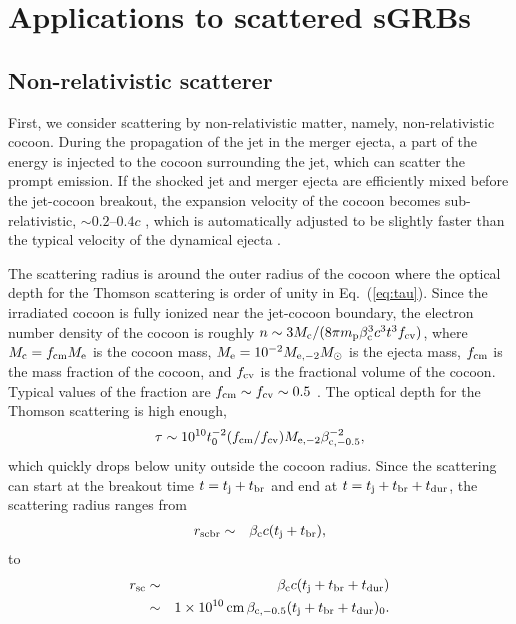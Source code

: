 \documentclass{emulateapj}
\begin{document}
\section{Applications to scattered sGRBs}
\label{sec:scatterer}

\subsection{Non-relativistic scatterer}\label{sec:nonrela}

First, we consider scattering by non-relativistic matter, namely, non-relativistic cocoon.
During the propagation of the jet in the merger ejecta, a part of the energy is 
injected to the cocoon surrounding the jet, which can scatter the prompt emission. 
If the shocked jet and merger ejecta are efficiently mixed before the jet-cocoon breakout, 
the expansion velocity of the cocoon becomes sub-relativistic, 
$\sim0.2$--$0.4c$ \citep{2017arXiv171005905I}, 
which is automatically adjusted to be slightly faster than the
typical velocity of the dynamical ejecta \citep[$\sim0.1$--$0.2c$; ][]{2013PhRvD..87b4001H, 2015PhRvD..91f4059S, 2016CQGra..33r4002L, 2016MNRAS.460.3255R, 
2016PhRvD..93d4019F, 2017PhRvD..95d4045D, 2017PhRvD..95b4029D, 2017PhRvD..96l4005B, 2017PhRvD..96l3012S}. 

The scattering radius is around the outer radius of the cocoon
where the optical depth for the Thomson scattering is order of unity in Eq.~(\ref{eq:tau}).
Since the irradiated cocoon is fully ionized near the jet-cocoon boundary,
the electron number density of the cocoon is roughly
$n\sim 3M_{\rm c}/(8\pi m_{\rm p}\beta_{\rm c}^3c^3t^3f_{\rm cv})$, 
where $M_{\rm c}=f_{\rm cm}M_{\rm e}$ is the cocoon mass, 
$M_{\rm e}=10^{-2}M_{\rm e,-2}M_{\odot}$ is the ejecta mass, 
$f_{\rm cm}$ is the mass fraction of the cocoon, 
and $f_{\rm cv}$ is the fractional volume of the cocoon.
Typical values of the fraction are $f_{\rm cm}\sim f_{\rm cv}\sim0.5$ \citep{2017arXiv171005905I}. 
The optical depth for the Thomson scattering is high enough,
\begin{eqnarray}\label{eq:opticaldepth}
\tau\sim10^{10}t_{0}^{-2}(f_{\rm cm}/f_{\rm cv})M_{\rm e,-2}\beta_{\rm c,-0.5}^{-2},
\end{eqnarray}
which quickly drops below unity outside the cocoon radius.
Since the scattering can start at the breakout time $t=t_{\rm j}+t_{\rm br}$
and end at $t=t_{\rm j}+t_{\rm br}+t_{\rm dur}$,
the scattering radius ranges from
\begin{eqnarray}\label{eq:radius0}
r_{\rm scbr} &\sim& \beta_{\rm c}c (t_{\rm j}+t_{\rm br}),
\end{eqnarray}
to
\begin{eqnarray}\label{eq:radius}
r_{\rm sc} &\sim& \beta_{\rm c}c (t_{\rm j}+t_{\rm br}+t_{\rm dur})
\nonumber\\
&\sim& 1\times10^{10}\,{\rm cm}\,\beta_{\rm c,-0.5} (t_{\rm j}+t_{\rm br}+t_{\rm dur})_{0}.
\end{eqnarray}
\end{document}
